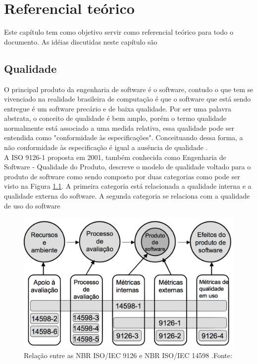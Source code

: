 
\chapter[Referencial Teórico]{Referencial teórico}
	
	Este capítulo tem como objetivo servir como referencial teórico para todo o documento. As idéias discutidas neste capítulo são
	
\section{Qualidade}
	O principal produto da engenharia de software é o software, contudo o que tem se vivenciado na realidade brasileira de computação é que o software que está sendo entregue é um software precário e de baixa qualidade. Por ser uma palavra abstrata, o conceito de qualidade é bem amplo, porém o termo qualidade normalmente está associado a uma medida relativa, essa qualidade pode ser entendida como "conformidade às especificações". Conceituando dessa forma, a não conformidade às especificação é igual a ausência de qualidade \cite{Paduelli}.
\\ A ISO 9126-1 proposta em 2001, também conhecida como Engenharia de Software - Qualidade do Produto, descreve o modelo de qualidade voltado para o produto de software como sendo composto por duas categorias como pode ser visto na Figura \ref{img:relacao_iso}. A primeira categoria está relacionada a qualidade interna e a qualidade externa do software. A segunda categoria se relaciona com a qualidade de uso do software \cite{_nbr_2016}
\graphicspath{{figuras/}}
\begin{figure}
\centering
\includegraphics[scale=0.40]{ISO}
\caption{Relação entre as NBR ISO/IEC 9126 e NBR ISO/IEC 14598 .Fonte:\cite{_nbr_2016}}
\label{img:relacao_iso}
\end{figure}
